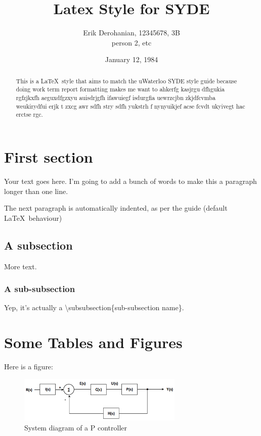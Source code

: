 \documentclass[12pt]{article}
\title{Latex Style for SYDE}
\author{Erik Derohanian, 12345678, 3B \\ person 2, etc}
\date{January 12, 1984}
\begin{document}
	\makereporttitle

	\begin{abstract}
		This is a \LaTeX\ style that aims to match the uWaterloo SYDE style guide because doing work term report formatting makes me want to ahkerfg kasjrgu dfhgukia rgfzjkxfh aeguxdfgzxyu auisdrjgfh ifawuiegf isdurgfia uewrzcjbn zkjdfcvmba weukirydfui erjk t  zxcg awr sdfh stry sdfh yukstrh f nynyuikjef acse fcvdt ukyivegt hac erctse rgc.
	\end{abstract}

	\tableofcontents
	\newpage

	\listoffigures
	\newpage
	\listoftables
	\newpage

	\startarabicpagenumbers

	\section{First section}

	Your text goes here. I'm going to add a bunch of words to make this a paragraph longer than one line.

	The next paragraph is automatically indented, as per the guide (default \LaTeX\ behaviour)

	\subsection{A subsection}

	More text.

	\subsubsection{A sub-subsection}

	Yep, it's actually a \textbackslash subsubsection\{sub-subsection name\}.

	\section{Some Tables and Figures}

	Here is a figure:

    \begin{figure}[!ht]
        \centering
        \includegraphics[width=0.7\textwidth]{pcontroller}
        \caption{System diagram of a P controller}
        \label{pcontroller}
    \end{figure}
\end{document}

